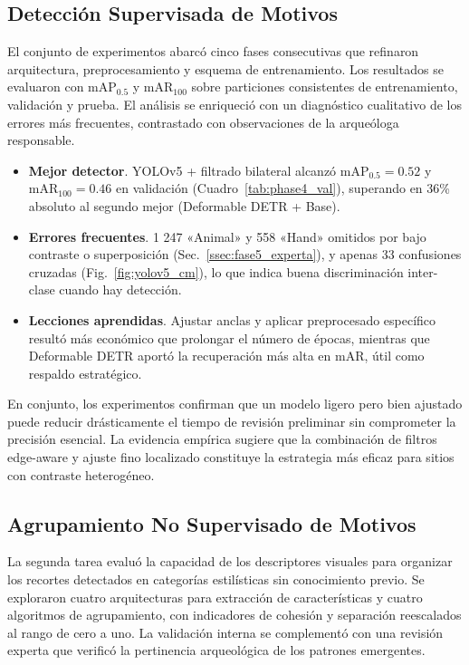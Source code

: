 \subsection{Detección Supervisada de Motivos}

El conjunto de experimentos abarcó cinco fases consecutivas que refinaron arquitectura, preprocesamiento y esquema de entrenamiento.
Los resultados se evaluaron con \(\mathrm{mAP}_{0.5}\) y \(\mathrm{mAR}_{100}\) sobre particiones consistentes de entrenamiento, validación y prueba.
El análisis se enriqueció con un diagnóstico cualitativo de los errores más frecuentes, contrastado con observaciones de la arqueóloga responsable.

\begin{itemize}
  \item \textbf{Mejor detector}.  YOLOv5 + filtrado bilateral alcanzó
        \(\mathrm{mAP}_{0.5}=0.52\) y \(\mathrm{mAR}_{100}=0.46\)
        en validación (Cuadro~\ref{tab:phase4_val}), superando en
        36\% absoluto al segundo mejor (Deformable DETR + Base).
  \item \textbf{Errores frecuentes}.  1 247 «Animal» y 558 «Hand»
        omitidos por bajo contraste o superposición (Sec.~\ref{ssec:fase5_experta}),
        y apenas 33 confusiones cruzadas (Fig.~\ref{fig:yolov5_cm}), lo que indica buena discriminación
        inter-clase cuando hay detección.
  \item \textbf{Lecciones aprendidas}.
        Ajustar anclas y aplicar preprocesado específico resultó más económico
        que prolongar el número de épocas, mientras que Deformable DETR aportó
        la recuperación más alta en \(\mathrm{mAR}\), útil como respaldo estratégico.
\end{itemize}

En conjunto, los experimentos confirman que un modelo ligero pero bien ajustado puede reducir drásticamente el tiempo de revisión preliminar sin comprometer la precisión esencial.
La evidencia empírica sugiere que la combinación de filtros edge-aware y ajuste fino localizado constituye la estrategia más eficaz para sitios con contraste heterogéneo.

\subsection{Agrupamiento No Supervisado de Motivos}

La segunda tarea evaluó la capacidad de los descriptores visuales para organizar los recortes detectados en categorías estilísticas sin conocimiento previo.
Se exploraron cuatro arquitecturas para extracción de características y cuatro algoritmos de agrupamiento, con indicadores de cohesión y separación reescalados al rango de cero a uno.
La validación interna se complementó con una revisión experta que verificó la pertinencia arqueológica de los patrones emergentes.

